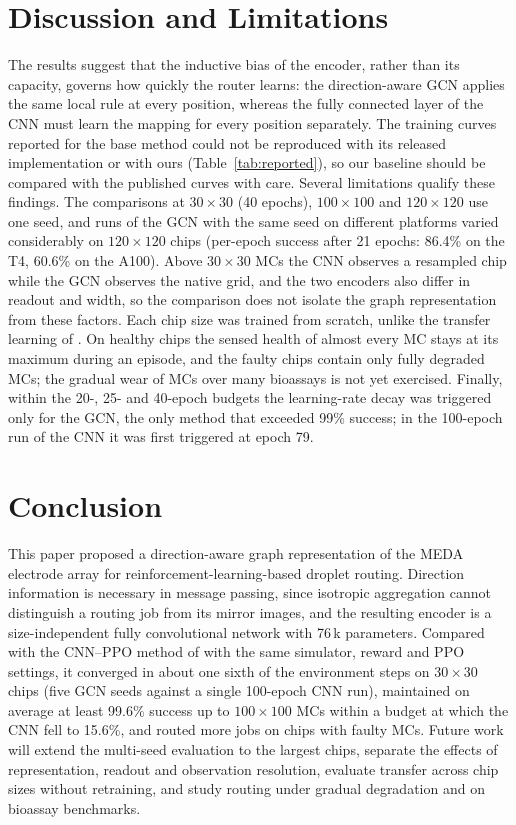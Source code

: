\documentclass[conference,onecolumn,11pt]{IEEEtran}
\begin{document}
\section{Discussion and Limitations}
The results suggest that the inductive bias of the encoder, rather than its capacity,
governs how quickly the router learns: the direction-aware GCN applies the same local
rule at every position, whereas the fully connected layer of the CNN must learn the mapping
for every position separately. The training curves reported for the base method could not be
reproduced with its released implementation or with ours (Table~\ref{tab:reported}), so
our baseline should be compared with the published curves with care. Several limitations qualify these findings. The comparisons
at $30\times30$ (40 epochs), $100\times100$ and $120\times120$ use one seed, and runs of the
GCN with the same seed on different platforms varied considerably on $120\times120$ chips
(per-epoch success after 21 epochs: 86.4\% on the T4, 60.6\% on the A100).
Above $30\times30$ MCs the CNN observes a resampled chip while the GCN observes the native
grid, and the two encoders also differ in readout and width, so the comparison does not
isolate the graph representation from these factors. Each chip size was trained from
scratch, unlike the transfer learning of \cite{elfar2023}. On healthy chips the sensed
health of almost every MC stays at its maximum during an episode, and the faulty chips
contain only fully degraded MCs; the gradual wear of MCs over many bioassays is not yet
exercised. Finally, within the 20-, 25- and 40-epoch budgets the learning-rate decay was
triggered only for the GCN, the only method that exceeded 99\% success; in the 100-epoch run
of the CNN it was first triggered at epoch 79.

\section{Conclusion}
This paper proposed a direction-aware graph representation of the MEDA electrode array for
reinforcement-learning-based droplet routing. Direction information is necessary in
message passing, since isotropic aggregation cannot distinguish a routing job from its mirror
images, and the resulting encoder is a size-independent fully convolutional network with
76\,k parameters. Compared with the CNN--PPO method of \cite{elfar2023} with the same
simulator, reward and PPO settings, it converged in about one sixth of the environment steps
on $30\times30$ chips (five GCN seeds against a single 100-epoch CNN run), maintained on
average at least 99.6\% success up to $100\times100$ MCs within a budget at which the CNN fell to
15.6\%, and routed more jobs on chips with faulty MCs. Future work will extend the multi-seed
evaluation to the largest chips, separate the effects of representation, readout and
observation resolution, evaluate transfer across chip sizes without retraining, and study
routing under gradual degradation and on bioassay benchmarks.
\end{document}
